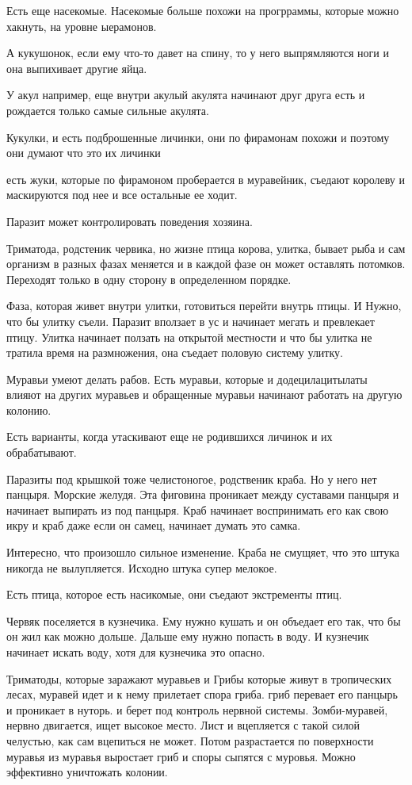 Есть еще насекомые. Насекомые больше похожи на прогрраммы, которые можно хакнуть, 
на уровне ыерамонов. 

А кукушонок, если ему что-то давет на спину, то у него выпрямляются ноги и она выпихивает
другие яйца.

У акул например, еще внутри акулый акулята начинают друг друга есть и
рождается только самые сильные акулята.

Кукулки, и есть подброшенные личинки, они по фирамонам похожи и поэтому
они думают что это их личинки

есть жуки, которые по фирамоном проберается в муравейник, съедают королеву и
маскируются под нее и все остальные ее ходит.


Паразит может контролировать поведения хозяина.

Триматода, родстеник червика,
но жизне  птица корова, улитка, бывает рыба и
сам организм в разных фазах меняется и
в каждой фазе он может оставлять потомков. Переходят
только в одну сторону в определенном порядке.

Фаза, которая живет внутри улитки, готовиться перейти внутрь птицы. И
Нужно, что бы улитку съели. Паразит вползает в ус и начинает
мегать и превлекает птицу. Улитка начинает ползать на открытой местности
и что бы улитка не тратила время на размножения, она съедает половую систему улитку.


Муравьи умеют делать рабов. Есть муравьи, которые
и додецилацитылаты влияют на других муравьев и
обращенные муравьи начинают работать на
другую колонию.

Есть варианты, когда утаскивают еще не родившихся личинок и
их обрабатывают.

Паразиты под крышкой тоже челистоногое, родственик краба. Но у него нет
панцыря. Морские желудя. Эта фиговина проникает
между суставами панцыря и начинает выпирать из под
панцыря. Краб начинает воспринимать его как свою икру и
краб даже если он самец, начинает думать это самка.

Интересно, что произошло сильное изменение. 
Краба не смущяет, что это штука никогда 
не вылупляется. Исходно штука супер мелокое. 

Есть птица, которое есть насикомые, 
они съедают экстременты птиц. 


Червяк поселяется в кузнечика. Ему нужно кушать и 
он объедает его так, что бы он жил как можно дольше. 
Дальше ему нужно попасть в воду. И кузнечик начинает 
искать воду, хотя для кузнечика это опасно. 

Триматоды, которые заражают муравьев и 
Грибы которые живут в тропических лесах,
муравей идет и к нему прилетает спора гриба. 
гриб перевает его панцырь и проникает в нуторь. 
и берет под контроль нервной системы. Зомби-муравей, 
нервно двигается, ищет высокое место. Лист и вцепляется с
такой силой челустью, как сам вцепиться не может. Потом
разрастается по поверхности муравья из муравья выростает гриб 
и споры сыпятся с муровья. Можно эффективно уничтожать колонии. 

